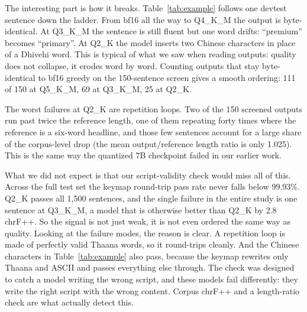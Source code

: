 \documentclass[10pt,twocolumn]{article}
\newcommand{\dv}[1]{{\thaanafont\RL{#1}}}
\begin{document}
The interesting part is how it breaks. Table~\ref{tab:example} follows
one devtest sentence down the ladder. From bf16 all the way to Q4\_K\_M
the output is byte-identical. At Q3\_K\_M the sentence is still fluent
but one word drifts: ``premium'' becomes ``primary''. At Q2\_K the model
inserts two Chinese characters in place of a Dhivehi word. This is
typical of what we saw when reading outputs: quality does not collapse,
it erodes word by word. Counting outputs that stay byte-identical to bf16
greedy on the 150-sentence screen gives a smooth ordering: 111 of 150 at
Q5\_K\_M, 69 at Q3\_K\_M, 25 at Q2\_K.

The worst failures at Q2\_K are repetition loops. Two of the 150 screened
outputs run past twice the reference length, one of them repeating
\dv{ކ.} forty times where the reference is a six-word headline, and those
few sentences account for a large share of the corpus-level drop (the
mean output/reference length ratio is only 1.025). This is the same way
the quantized 7B checkpoint failed in our earlier work.

What we did not expect is that our script-validity check would miss all
of this. Across the full test set the keymap round-trip pass rate never
falls below 99.93\%. Q2\_K passes all 1{,}500 sentences, and the single
failure in the entire study is one sentence at Q3\_K\_M, a model that is
otherwise better than Q2\_K by 2.8 chrF++. So the signal is not just
weak, it is not even ordered the same way as quality. Looking at the
failure modes, the reason is clear. A repetition loop is made of
perfectly valid Thaana words, so it round-trips cleanly. And the Chinese
characters in Table~\ref{tab:example} also pass, because the keymap
rewrites only Thaana and ASCII and passes everything else through. The
check was designed to catch a model writing the wrong script, and these
models fail differently: they write the right script with the wrong
content. Corpus chrF++ and a length-ratio check are what actually detect
this.
\end{document}
